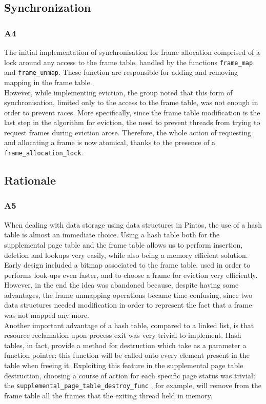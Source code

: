 \documentclass[a4wide, 11pt]{article}
\newcommand{\tx}{\texttt}
\begin{document}
\subsection{Synchronization}
\subsubsection{A4}
The initial implementation of synchronisation for frame allocation comprised of a lock around any access to the frame table, handled  by the functions \tx{frame\_map} and \tx{frame\_unmap}. These function are responsible for adding and removing mapping in the frame table. \\
However, while implementing eviction, the group noted that this form of synchronisation, limited only to the access to the frame table, was not enough in order to prevent races. More specifically, since the frame table modification is the last step in the algorithm for eviction, the need to prevent threads from trying to request frames during eviction arose. Therefore, the whole action of requesting and allocating a frame is now atomical, thanks to the presence of a \tx{frame\_allocation\_lock}.
\subsection{Rationale}
\subsubsection{A5}
When dealing with data storage using data structures in Pintos, the use of a hash table is almost an immediate choice. Using a hash table both for the supplemental page table and the frame table allows us to perform insertion, deletion and lookups very easily, while also being a memory efficient solution. Early design included a bitmap associated to the frame table, used in order to performs look-ups even faster, and to choose a frame for eviction very efficiently. However, in the end the idea was abandoned because, despite having some advantages, the frame unmapping operations became time confusing, since two data structures needed modification in order to represent the fact that a frame was not mapped any more. \\
Another important advantage of a hash table, compared to a linked  list, is that resource reclamation upon process exit was very trivial to implement. Hash tables, in fact, provide a method for destruction which take as a parameter a function pointer: this function will be called onto every  element present in the table when freeing it. Exploiting this feature in the supplemental page table destruction, choosing a course of action for each specific page status was trivial: the \tx{supplemental\_page\_table\_destroy\_func} , for example, will remove from the frame table all the frames that the exiting thread held in memory.
\end{document}
